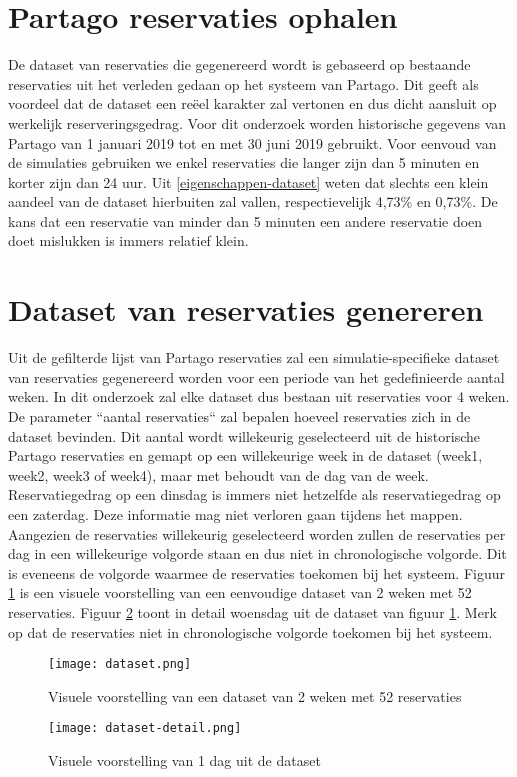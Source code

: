\section{Partago reservaties ophalen} \label{partago-reservaties-ophalen}
De dataset van reservaties die gegenereerd wordt is gebaseerd op bestaande reservaties uit het verleden gedaan op het systeem van Partago. Dit geeft als voordeel dat de dataset een reëel karakter zal vertonen en dus dicht aansluit op werkelijk reserveringsgedrag. Voor dit onderzoek worden historische gegevens van Partago van 1 januari 2019 tot en met 30 juni 2019 gebruikt. Voor eenvoud van de simulaties gebruiken we enkel reservaties die langer zijn dan 5 minuten en korter zijn dan 24 uur. Uit \ref{eigenschappen-dataset} weten dat slechts een klein aandeel van de dataset hierbuiten zal vallen, respectievelijk 4,73\% en 0,73\%. De kans dat een reservatie van minder dan 5 minuten een andere reservatie doen doet mislukken is immers relatief klein.

\section{Dataset van reservaties genereren} \label{dataset-genereren}
Uit de gefilterde lijst van Partago reservaties zal een simulatie-specifieke dataset van reservaties gegenereerd worden voor een periode van het gedefinieerde aantal weken. In dit onderzoek zal elke dataset dus bestaan uit reservaties voor 4 weken. De parameter ``aantal reservaties`` zal bepalen hoeveel reservaties zich in de dataset bevinden. Dit aantal wordt willekeurig geselecteerd uit de historische Partago reservaties en gemapt op een willekeurige week in de dataset (week1, week2, week3 of week4), maar met behoudt van de dag van de week. Reservatiegedrag op een dinsdag is immers niet hetzelfde als reservatiegedrag op een zaterdag. Deze informatie mag  niet verloren gaan tijdens het mappen. Aangezien de reservaties willekeurig geselecteerd worden zullen de reservaties per dag in een willekeurige volgorde staan en dus niet in chronologische volgorde. Dit is eveneens de volgorde waarmee de reservaties toekomen bij het systeem. Figuur \ref{fig:visuele-voorstelling-dataset} is een visuele voorstelling van een eenvoudige dataset van 2 weken met 52 reservaties. Figuur \ref{fig:visuele-voorstelling-dag-dataset} toont in detail woensdag uit de dataset van figuur \ref{fig:visuele-voorstelling-dataset}. Merk op dat de reservaties niet in chronologische volgorde toekomen bij het systeem.
\begin{figure}[h]
	\texttt{[image: dataset.png]}
	\caption[Visuele voorstelling van een dataset]{Visuele voorstelling van een dataset van 2 weken met 52 reservaties}
	\label{fig:visuele-voorstelling-dataset}
\end{figure}
\begin{figure}[h]
	\texttt{[image: dataset-detail.png]}
	\caption[Visuele voorstelling van 1 dag in de dataset]{Visuele voorstelling van 1 dag uit de dataset}
	\label{fig:visuele-voorstelling-dag-dataset}
\end{figure}

